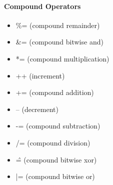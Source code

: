 \documentclass[../informe_krapp.tex]{subfiles}
\begin{document}
\begin{multicols}{2}
	\paragraph{Compound Operators}
	\begin{itemize}
		\item \%= (compound remainder)
		\item \&= (compound bitwise and)
		\item *= (compound multiplication)
		\item ++ (increment)
		\item += (compound addition)
		\item -- (decrement)
		\item -= (compound subtraction)
		\item /= (compound division)
		\item \^= (compound bitwise xor)
		\item |= (compound bitwise or)
	\end{itemize}

\end{multicols}
\end{document}
